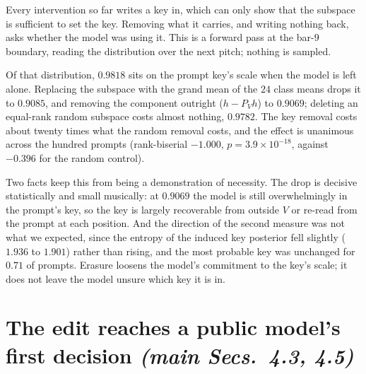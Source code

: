 \documentclass{article}
\begin{document}
Every intervention so far writes a key in, which can only show that the subspace is
sufficient to set the key. Removing what it carries, and writing nothing back, asks
whether the model was using it. This is a forward pass at the bar-$9$ boundary, reading
the distribution over the next pitch; nothing is sampled.

Of that distribution, $0.9818$ sits on the prompt key's scale when the model is left
alone. Replacing the subspace with the grand mean of the $24$ class means drops it to
$0.9085$, and removing the component outright ($h - P_V h$) to $0.9069$; deleting an
equal-rank random subspace costs almost nothing, $0.9782$. The key removal costs about
twenty times what the random removal costs, and the effect is unanimous across the
hundred prompts (rank-biserial $-1.000$, $p = 3.9 \times 10^{-18}$, against $-0.396$
for the random control).

Two facts keep this from being a demonstration of necessity.
The drop is decisive statistically and small musically: at $0.9069$ the model is still
overwhelmingly in the prompt's key, so the key is largely recoverable from outside $V$
or re-read from the prompt at each position. And the direction of the second measure
was not what we expected, since the entropy of the induced key posterior fell slightly
($1.936$ to $1.901$) rather than rising, and the most probable key was unchanged for
$0.71$ of prompts. Erasure loosens the model's commitment to the key's scale; it does
not leave the model unsure which key it is in.

\section{The edit reaches a public model's first decision \normalfont\textit{(main Secs.~4.3, 4.5)}}
\label{sec:public-logits}
%
\end{document}
